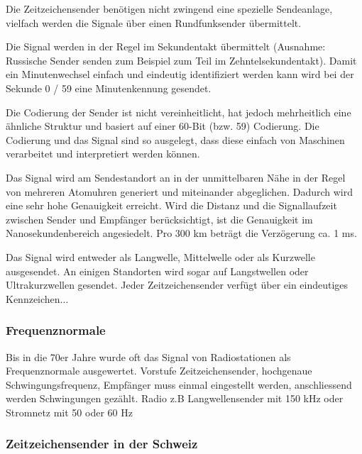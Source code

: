 Die Zeitzeichensender benötigen nicht zwingend eine spezielle Sendeanlage, vielfach werden die Signale über einen Rundfunksender übermittelt.

Die Signal werden in der Regel im Sekundentakt übermittelt (Ausnahme: Russische Sender senden zum Beispiel zum Teil im Zehntelsekundentakt). Damit ein Minutenwechsel einfach und eindeutig identifiziert werden kann wird bei der Sekunde 0 / 59 eine Minutenkennung gesendet.

Die Codierung der Sender ist nicht vereinheitlicht, hat jedoch mehrheitlich eine ähnliche Struktur und basiert auf einer 60-Bit (bzw. 59) Codierung. Die Codierung und das Signal sind so ausgelegt, dass diese einfach von Maschinen verarbeitet und interpretiert werden können.

Das Signal wird am Sendestandort an in der unmittelbaren Nähe in der Regel von mehreren Atomuhren generiert und miteinander abgeglichen. Dadurch wird eine sehr hohe Genauigkeit erreicht. Wird die Distanz und die Signallaufzeit zwischen Sender und Empfänger berücksichtigt, ist die Genauigkeit im Nanosekundenbereich angesiedelt. Pro 300 km beträgt die Verzögerung ca. 1 ms.

Das Signal wird entweder als Langwelle, Mittelwelle oder als Kurzwelle ausgesendet. An einigen Standorten wird sogar auf Langstwellen oder Ultrakurzwellen gesendet.
Jeder Zeitzeichensender verfügt über ein eindeutiges Kennzeichen...

\subsubsection{Frequenznormale}
Bis in die 70er Jahre wurde oft das Signal von Radiostationen als Frequenznormale ausgewertet.
Vorstufe Zeitzeichensender, hochgenaue Schwingungsfrequenz, Empfänger muss einmal eingestellt werden, anschliessend werden Schwingungen gezählt. Radio z.B Langwellensender mit 150 kHz oder Stromnetz mit 50 oder 60 Hz

\subsubsection{Zeitzeichensender in der Schweiz}

